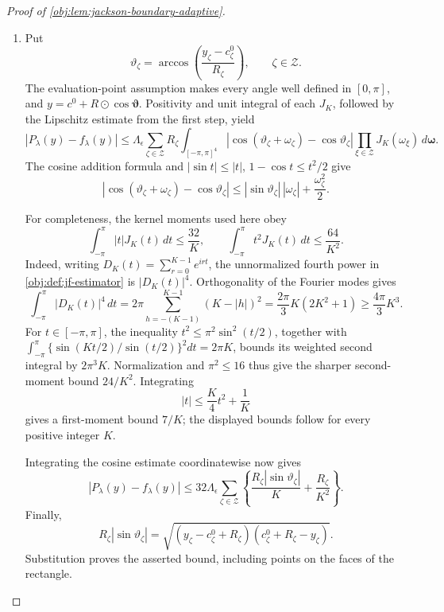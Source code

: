 \begin{proof}[Proof of \cref{obj:lem:jackson-boundary-adaptive}]
\begin{enumerate}
\item Put
\[
\vartheta_\zeta
=
\arccos\!\left(\frac{y_\zeta-c^0_\zeta}{R_\zeta}\right),
\qquad \zeta\in\mathcal Z.
\]
The evaluation-point assumption makes every angle well defined in \([0,\pi]\), and \(y=c^0+R\odot\cos\boldsymbol\vartheta\). Positivity and unit integral of each \(J_K\), followed by the Lipschitz estimate from the first step, yield
\[
|P_\lambda(y)-f_\lambda(y)|
\leq
\Lambda_\epsilon\sum_{\zeta\in\mathcal Z}R_\zeta
\int_{[-\pi,\pi]^4}
\left|\cos(\vartheta_\zeta+\omega_\zeta)
-\cos\vartheta_\zeta\right|
\prod_{\xi\in\mathcal Z}J_K(\omega_\xi)
\,d\boldsymbol\omega.
\]
The cosine addition formula and
\(|\sin t|\leq|t|\), \(1-\cos t\leq t^2/2\) give
\[
|\cos(\vartheta_\zeta+\omega_\zeta)-\cos\vartheta_\zeta|
\leq|\sin\vartheta_\zeta|\,|\omega_\zeta|
+\frac{\omega_\zeta^2}{2}.
\]

For completeness, the kernel moments used here obey
\[
\int_{-\pi}^{\pi}|t|J_K(t)\,dt\leq\frac{32}{K},
\qquad
\int_{-\pi}^{\pi}t^2J_K(t)\,dt\leq\frac{64}{K^2}.
\]
Indeed, writing \(D_K(t)=\sum_{r=0}^{K-1}e^{irt}\), the unnormalized fourth power in \cref{obj:def:jf-estimator} is \(|D_K(t)|^4\). Orthogonality of the Fourier modes gives
\[
\int_{-\pi}^{\pi}|D_K(t)|^4\,dt
=2\pi\sum_{h=-(K-1)}^{K-1}(K-|h|)^2
=\frac{2\pi}{3}K(2K^2+1)
\geq\frac{4\pi}{3}K^3.
\]
For \(t\in[-\pi,\pi]\), the inequality
\(t^2\leq\pi^2\sin^2(t/2)\), together with
\(\int_{-\pi}^{\pi}\{\sin(Kt/2)/\sin(t/2)\}^2dt=2\pi K\),
bounds its weighted second integral by \(2\pi^3K\).
Normalization and \(\pi^2\leq16\) thus give the sharper second-moment bound \(24/K^2\). Integrating
\[
|t|\leq\frac K4t^2+\frac1K
\]
gives a first-moment bound \(7/K\); the displayed bounds follow for every positive integer \(K\).

Integrating the cosine estimate coordinatewise now gives
\[
|P_\lambda(y)-f_\lambda(y)|
\leq
32\Lambda_\epsilon
\sum_{\zeta\in\mathcal Z}
\left\{
\frac{R_\zeta|\sin\vartheta_\zeta|}{K}
+\frac{R_\zeta}{K^2}
\right\}.
\]
Finally,
\[
R_\zeta|\sin\vartheta_\zeta|
=
\sqrt{(y_\zeta-c^0_\zeta+R_\zeta)
(c^0_\zeta+R_\zeta-y_\zeta)}.
\]
Substitution proves the asserted bound, including points on the faces of the rectangle. %
\end{enumerate}
\end{proof}
